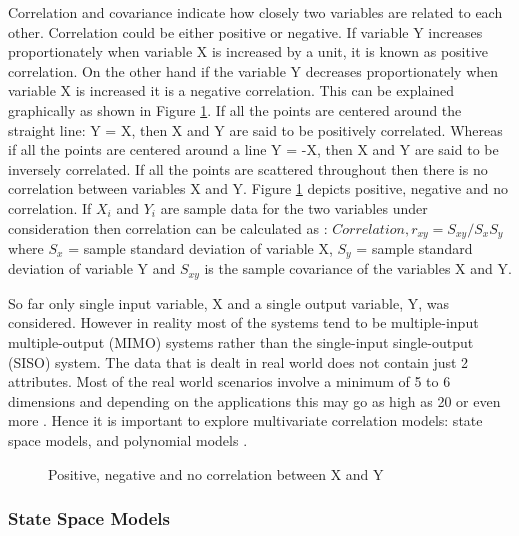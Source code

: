 \documentclass[article,type=msc,colorback,12pt,accentcolor=tud8b,table]{tudthesis}
\begin{document}
	Correlation and covariance indicate how closely two variables are related to each other. Correlation could be either positive or negative. If variable Y increases proportionately when variable X is increased by a unit, it is known as positive correlation. On the other hand if the variable Y decreases proportionately when variable X is increased it is a negative correlation. This can be explained graphically as shown in Figure \ref{fig:correlation}. If all the points are centered around the straight line: Y = X, then X and Y are said to be positively correlated. Whereas if all the points are centered around a line Y = -X, then X and Y are said to be inversely correlated. If all the points are scattered throughout then there is no correlation between variables X and Y. Figure \ref{fig:correlation} depicts positive, negative and no correlation. If $X_i$ and $Y_i$ are sample data for the two variables under consideration then correlation can be calculated as \cite{freedman2009statistical}: $ Correlation, r_{xy} = S_{xy} / S_x S_y $ where $S_x$ = sample standard deviation of variable X, $S_y$ = sample standard deviation of variable Y and $S_{xy}$ is the sample covariance of the variables X and Y. 
\par
So far only single input variable, X and a single output variable, Y, was considered. However in reality most of the systems tend to be multiple-input multiple-output (MIMO) systems rather than the single-input single-output (SISO) system. The data that is dealt in real world does not contain just 2 attributes. Most of the real world scenarios involve a minimum of 5 to 6 dimensions and depending on the applications this may go as high as 20 or even more \cite{friendly2002corrgrams, li2010judging}. Hence it is important to explore multivariate correlation models: state space models, and polynomial models \cite{ljung1987system, ljung1998system, ljung1999system}.

 \begin{figure}
 \begin{center}
  \makebox[\textwidth]{\texttt{[image: B7]}}
\end{center}
\caption{Positive, negative and no correlation between X and Y }
\label{fig:correlation}
\end{figure}

\subsubsection{State Space Models}
\end{document}
